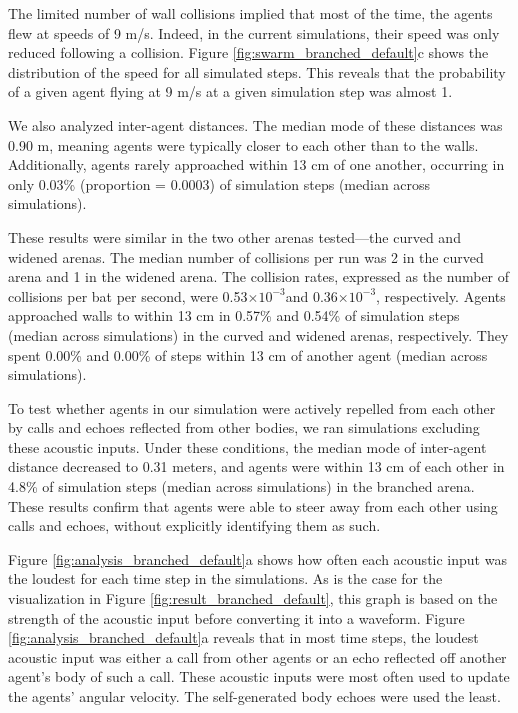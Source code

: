 \documentclass[a4paper, 11pt]{article}
\newcommand{\thou}{$\times 10^{-3}$}
\begin{document}
The limited number of wall collisions implied that most of the time, the agents flew at speeds of 9 m/s. Indeed, in the current simulations, their speed was only reduced following a collision. Figure \ref{fig:swarm_branched_default}c shows the distribution of the speed for all simulated steps. This reveals that the probability of a given agent flying at 9 m/s at a given simulation step was almost 1.

We also analyzed inter-agent distances. The median mode of these distances was 0.90 m, meaning agents were typically closer to each other than to the walls. Additionally, agents rarely approached within 13 cm of one another, occurring in only 0.03\% (proportion = 0.0003) of simulation steps (median across simulations). 

These results were similar in the two other arenas tested—the curved and widened arenas. The median number of collisions per run was 2 in the curved arena and 1 in the widened arena. The collision rates, expressed as the number of collisions per bat per second, were 0.53\thou and 0.36\thou, respectively. Agents approached walls to within 13 cm in 0.57\% and 0.54\% of simulation steps (median across simulations) in the curved and widened arenas, respectively. They spent 0.00\% and 0.00\% of steps within 13 cm of another agent (median across simulations).

To test whether agents in our simulation were actively repelled from each other by calls and echoes reflected from other bodies, we ran simulations excluding these acoustic inputs. Under these conditions, the median mode of inter-agent distance decreased to 0.31 meters, and agents were within 13 cm of each other in 4.8\% of simulation steps (median across simulations) in the branched arena. These results confirm that agents were able to steer away from each other using calls and echoes, without explicitly identifying them as such.

%
%

Figure \ref{fig:analysis_branched_default}a shows how often each acoustic input was the loudest for each time step in the simulations. As is the case for the visualization in Figure \ref{fig:result_branched_default}, this graph is based on the strength of the acoustic input before converting it into a waveform. Figure \ref{fig:analysis_branched_default}a reveals that in most time steps, the loudest acoustic input was either a call from other agents or an echo reflected off another agent’s body of such a call. These acoustic inputs were most often used to update the agents' angular velocity. The self-generated body echoes were used the least.
\end{document}
